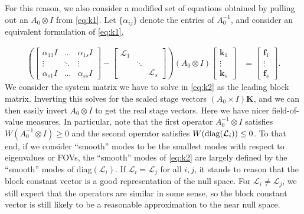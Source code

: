 \documentclass[a4paper,10pt]{article}
\begin{document}
For this reason, we also consider a modified set of equations obtained by pulling
out an $A_0\otimes I$ from \eqref{eq:k1}. Let $\{\alpha_{ij}\}$ denote the entries
of $A_0^{-1}$, and consider an equivalent formulation of \eqref{eq:k1},

%
\begin{align}\label{eq:k2}
\left( \begin{bmatrix} \alpha_{11} I & ... & \alpha_{1s}I  \\ \vdots & \ddots & \vdots
		\\ \alpha_{s1}I &  ... & \alpha_{ss}I\end{bmatrix}
	- \begin{bmatrix} \mathcal{L}_1 &  \\
	 & \ddots & \\ & & \mathcal{L}_s \end{bmatrix} \right) 
	(A_0\otimes I)
	\begin{bmatrix} \mathbf{k}_1 \\ \vdots \\ \mathbf{k}_s \end{bmatrix} 
& = \begin{bmatrix} \mathbf{f}_1 \\ \vdots \\ \mathbf{f}_s \end{bmatrix}.
\end{align}
%
We consider the system matrix we have to solve in \eqref{eq:k2} as the leading
block matrix. Inverting this solves for the scaled stage vectors $(A_0\times I)\mathbf{K}$,
and we can then easily invert $A_0\otimes I$ to get the real stage vectors.
Here we have nicer field-of-value measures. In particular, note that the first
operator $A_0^{-1}\otimes I$ satisfies $W(A_0^{-1}\otimes I) \geq 0$ and the second operator
satisfies $W(\textnormal{diag}(\mathcal{L}_i)) \leq 0$. To that end, if we consider
``smooth'' modes to be the smallest modes with respect to eigenvalues or FOVs,
the ``smooth'' modes of \eqref{eq:k2} are largely defined by the ``smooth'' modes
of diag$(\mathcal{L}_i)$. If $\mathcal{L}_i = \mathcal{L}_j$ for all $i,j$, it
stands to reason that the block constant vector is a good representation of the
null space. For $\mathcal{L}_i \neq \mathcal{L}_j$, we still expect that the
operators are similar in some sense, so the block constant vector is still
likely to be a reasonable approximation to the near null space.

\end{document}
